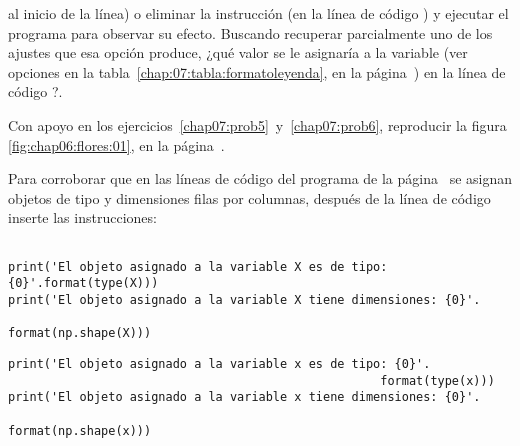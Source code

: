 \begin{appendices}
\begin{prob}
al inicio
de la línea) o eliminar la instrucción  
(en la línea de código ) y ejecutar el programa para 
observar su efecto. Buscando recuperar parcialmente uno de los ajustes
que esa opción produce, ¿qué valor se le asignaría a la variable
 (ver opciones en la tabla~\ref{chap:07:tabla:formatoleyenda},
en la página~\pageref{chap:07:tabla:formatoleyenda})
 en la línea de código ?.
\end{prob}
%
\begin{prob}
\label{chap07:prob8}
Con apoyo en los ejercicios~\ref{chap07:prob5}~y~\ref{chap07:prob6},
reproducir la figura
\ref{fig:chap06:flores:01}, en la
página~\pageref{fig:chap06:flores:01}.
\end{prob}
%
\begin{prob}
\label{chap07:prob9}
Para corroborar que en las líneas de código  del
programa de la página~\pageref{code:chap07:matplotlib3D:prog:01}
se asignan objetos de tipo  y dimensiones
 filas por  columnas, después
de la línea de código  inserte las instrucciones:
\begin{mymdframed}
\lstset{numberfirstline=true, firstnumber=26, numbers=left, 
        numberstyle=\scriptsize, stepnumber=1, numbersep=3pt}
\begin{lstlisting}[basicstyle=\ttfamily\scriptsize,frame=single] 

print('El objeto asignado a la variable X es de tipo: {0}'.format(type(X)))
print('El objeto asignado a la variable X tiene dimensiones: {0}'.
                                                    format(np.shape(X)))
\end{lstlisting}
\end{mymdframed}

\begin{mymdframed}
\lstset{numberfirstline=true, firstnumber=32, numbers=left, 
        numberstyle=\scriptsize, stepnumber=1, numbersep=3pt}
\begin{lstlisting}[basicstyle=\ttfamily\scriptsize,frame=single] 
print('El objeto asignado a la variable x es de tipo: {0}'.
                                                    format(type(x)))
print('El objeto asignado a la variable x tiene dimensiones: {0}'.
                                                    format(np.shape(x)))


\end{lstlisting}
\end{mymdframed}
\end{prob}
\end{appendices}
